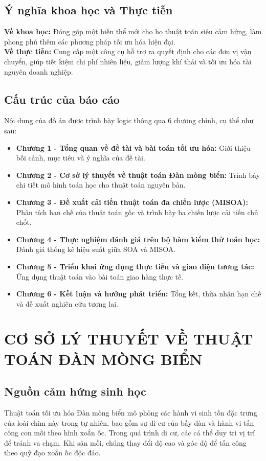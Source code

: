 \documentclass[12pt, a4paper]{article}
\begin{document}
\subsection{Ý nghĩa khoa học và Thực tiễn}
\textbf{Về khoa học:} Đóng góp một biến thể mới cho họ thuật toán siêu cảm hứng, làm phong phú thêm các phương pháp tối ưu hóa hiện đại. \\
\textbf{Về thực tiễn:} Cung cấp một công cụ hỗ trợ ra quyết định cho các đơn vị vận chuyển, giúp tiết kiệm chi phí nhiên liệu, giảm lượng khí thải và tối ưu hóa tài nguyên doanh nghiệp.

\subsection{Cấu trúc của báo cáo}
Nội dung của đồ án được trình bày logic thông qua 6 chương chính, cụ thể như sau:
\begin{itemize}
    \item \textbf{Chương 1 - Tổng quan về đề tài và bài toán tối ưu hóa:} Giới thiệu bối cảnh, mục tiêu và ý nghĩa của đề tài.
    \item \textbf{Chương 2 - Cơ sở lý thuyết về thuật toán Đàn mòng biển:} Trình bày chi tiết mô hình toán học cho thuật toán nguyên bản.
    \item \textbf{Chương 3 - Đề xuất cải tiến thuật toán đa chiến lược (MISOA):} Phân tích hạn chế của thuật toán gốc và trình bày ba chiến lược cải tiến chủ chốt.
    \item \textbf{Chương 4 - Thực nghiệm đánh giá trên bộ hàm kiểm thử toán học:} Đánh giá thống kê hiệu suất giữa SOA và MISOA.
    \item \textbf{Chương 5 - Triển khai ứng dụng thực tiễn và giao diện tương tác:} Ứng dụng thuật toán vào bài toán giao hàng thực tế.
    \item \textbf{Chương 6 - Kết luận và hướng phát triển:} Tổng kết, thừa nhận hạn chế và đề xuất nghiên cứu tương lai.
\end{itemize}

\newpage
\section{CƠ SỞ LÝ THUYẾT VỀ THUẬT TOÁN ĐÀN MÒNG BIỂN}

\subsection{Nguồn cảm hứng sinh học}
Thuật toán tối ưu hóa Đàn mòng biển \cite{soa_original} mô phỏng các hành vi sinh tồn đặc trưng của loài chim này trong tự nhiên, bao gồm sự di cư của bầy đàn và hành vi tấn công con mồi theo hình xoắn ốc. Trong quá trình di cư, các cá thể duy trì vị trí để tránh va chạm. Khi săn mồi, chúng thay đổi độ cao và góc độ để tấn công theo quỹ đạo xoắn ốc độc đáo.
\end{document}
